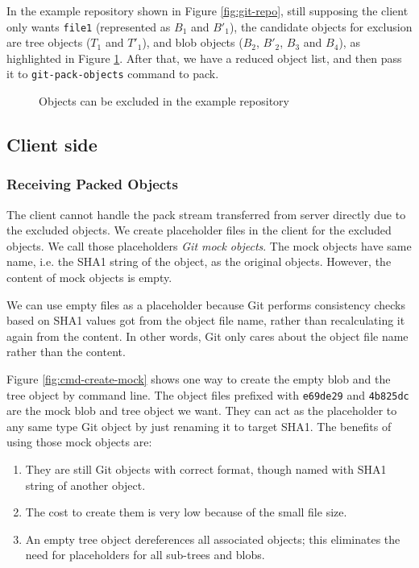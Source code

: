 \documentclass[copyrightwanted=false]{sigplanconf}
\begin{document}
In the example repository shown in Figure \ref{fig:git-repo}, still supposing
the client only wants \verb|file1| (represented as $B_1$ and $B'_1$), the
candidate objects for exclusion are tree objects ($T_1$ and $T'_1$), and blob
objects ($B_2$, $B'_2$, $B_3$ and $B_4$), as highlighted in Figure
\ref{fig:find-obj-to-remove}.
After that, we have a reduced object list, and then pass it to
\verb|git-pack-objects| command to pack.
\begin{figure}[htpb]
  \centering
  
  \caption{Objects can be excluded in the example repository}
  \label{fig:find-obj-to-remove}
\end{figure}


\subsection{Client side}
\subsubsection{Receiving Packed Objects}
The client cannot handle the pack stream transferred from server directly
due to the excluded objects.
We create placeholder files in the client for the excluded objects.
We call those placeholders \emph{Git mock objects}.
The mock objects have same name, i.e. the SHA1 string of the object, as the
original objects.
However, the content of mock objects is empty.

We can use empty files as a placeholder because Git
performs consistency checks based on SHA1 values got from the object file name,
rather than recalculating it again from the content.
In other words, Git only cares about the object file name rather than the
content.

Figure \ref{fig:cmd-create-mock} shows one way to create the empty blob and the tree
object by command line.
The object files prefixed with \verb|e69de29| and \verb|4b825dc| are the mock
blob and tree object we want.
They can act as the placeholder to any same type Git object by just renaming it
to target SHA1.
The benefits of using those mock objects are:
\begin{enumerate}
  \item They are still Git objects with correct format, though named with SHA1
    string of another object.

  \item The cost to create them is very low because of the small file size.

  \item An empty tree object dereferences all associated objects;
    this eliminates the need for placeholders for all sub-trees and blobs.
\end{enumerate}
\end{document}
